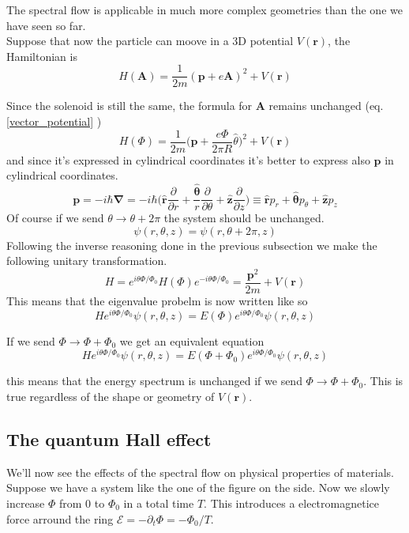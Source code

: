         The spectral flow is applicable in much more complex geometries than the one we have seen so far.\\
        Suppose that now the particle can moove in a 3D potential $V(\mathbf r)$, the Hamiltonian is
        \[
            H(\mathbf A)=\frac 1{2m}(\mathbf p + e\mathbf A)^2 + V(\mathbf r) 
        \]

        Since the solenoid is still the same, the formula for $\mathbf A$ remains unchanged (eq. \ref{vector_potential} )
        \[
            H(\Phi)=\frac 1{2m}\bigg(\mathbf p + \frac{e\Phi}{2\pi R}\hat \theta\bigg)^2 + V(\mathbf r)
        \]
        and since it's expressed in cylindrical coordinates it's better to express also $\mathbf p$ in cylindrical coordinates.
        \[
         \mathbf p =-i\hbar \mathbf \nabla=-i\hbar\bigg( 
             \mathbf{\hat r}\frac{\partial}{\partial r}+ \frac{\mathbf {\hat \theta}}{r}\frac{\partial}{\partial \theta} + \mathbf{\hat z}\frac{\partial}{\partial z}  \bigg) \equiv
             \mathbf{\hat r} p_r+ \mathbf {\hat \theta} p_\theta + \mathbf{\hat z} p_z
        \]
        Of course if we send $\theta \to \theta + 2\pi$ the system should be unchanged.
        \[
            \psi(r,\theta,z)=\psi(r,\theta+2\pi,z)
        \]
        Following the inverse reasoning done in the previous subsection we make the following unitary transformation.
        \[
            H=e^{i\theta\Phi/\Phi_0}H(\Phi)e^{-i\theta\Phi/\Phi_0}=\frac  {\mathbf p^2} {2m} + V(\mathbf r)
        \]
        This means that the eigenvalue probelm is now written like so
        \[
            He^{i\theta\Phi/\Phi_0}\psi(r,\theta,z)=E(\Phi)e^{i\theta\Phi/\Phi_0}\psi(r,\theta,z)
        \]

        If we send $\Phi \to \Phi+\Phi_0$ we get an equivalent equation
        \[
            He^{i\theta\Phi/\Phi_0}\psi(r,\theta,z)=E(\Phi+\Phi_0)e^{i\theta\Phi/\Phi_0}\psi(r,\theta,z)
        \]

        this means that the energy spectrum is unchanged if we send $\Phi \to \Phi+\Phi_0$. This is true regardless of the shape or geometry of $V(\mathbf r)$.
        
    
    \subsection*{The quantum Hall effect}

    
    
        We'll now see the effects of the spectral flow on physical properties of materials. Suppose we have a system like the one of the figure on the side. Now we slowly increase $\Phi$ from 0 to $\Phi_0$ in a total time $T$. This introduces a electromagnetice force arround the ring $\mathcal{E}=-\partial_t\Phi=-\Phi_0/T$.
    
